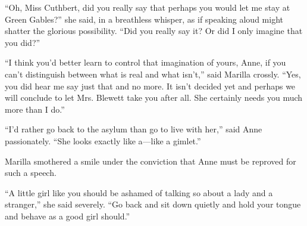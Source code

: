 \documentclass[a4paper]{article}
\begin{document}
``Oh, Miss Cuthbert, did you really say that perhaps you would let me stay at Green Gables?'' she said, in a breathless whisper, as if speaking aloud might shatter the glorious possibility. ``Did you really say it? Or did I only imagine that you did?''

``I think you'd better learn to control that imagination of yours, Anne, if you can't distinguish between what is real and what isn't,'' said Marilla crossly. ``Yes, you did hear me say just that and no more. It isn't decided yet and perhaps we will conclude to let Mrs. Blewett take you after all. She certainly needs you much more than I do.''

``I'd rather go back to the asylum than go to live with her,'' said Anne passionately. ``She looks exactly like a---like a gimlet.''

Marilla smothered a smile under the conviction that Anne must be reproved for such a speech.

``A little girl like you should be ashamed of talking so about a lady and a stranger,'' she said severely. ``Go back and sit down quietly and hold your tongue and behave as a good girl should.''
\end{document}
